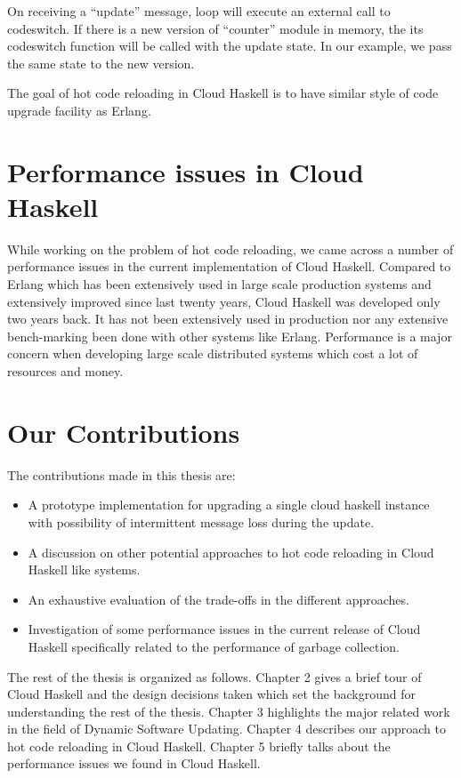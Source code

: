 On receiving a ``update'' message, loop will execute an external call
to codeswitch. If there is a new version of ``counter'' module in
memory, the its codeswitch function will be called with the update
state. In our example, we pass the same state to the new version.

The goal of hot code reloading in Cloud Haskell is to have similar
style of code upgrade facility as Erlang.

\section{Performance issues in Cloud Haskell}

While working on the problem of hot code reloading, we came across a
number of performance issues in the current implementation of Cloud
Haskell. Compared to Erlang which has been extensively used in large
scale production systems and extensively improved since last twenty
years, Cloud Haskell was developed only two years back. It has not
been extensively used in production nor any extensive bench-marking
been done with other systems like Erlang. Performance is a major
concern when developing large scale distributed systems which cost a
lot of resources and money.

\section{Our Contributions}

The contributions made in this thesis are:
\begin{itemize}
\item A prototype implementation for upgrading a single cloud haskell
  instance with possibility of intermittent message loss during the
  update.
\item A discussion on other potential approaches to hot code reloading
  in Cloud Haskell like systems.
\item An exhaustive evaluation of the trade-offs in the different
  approaches.
\item Investigation of some performance issues in the current release
  of Cloud Haskell specifically related to the performance of garbage
  collection.
\end{itemize}

The rest of the thesis is organized as follows. Chapter 2 gives a
brief tour of Cloud Haskell and the design decisions taken which set
the background for understanding the rest of the thesis. Chapter 3
highlights the major related work in the field of Dynamic Software
Updating. Chapter 4 describes our approach to hot code reloading in
Cloud Haskell. Chapter 5 briefly talks about the performance issues we
found in Cloud Haskell.